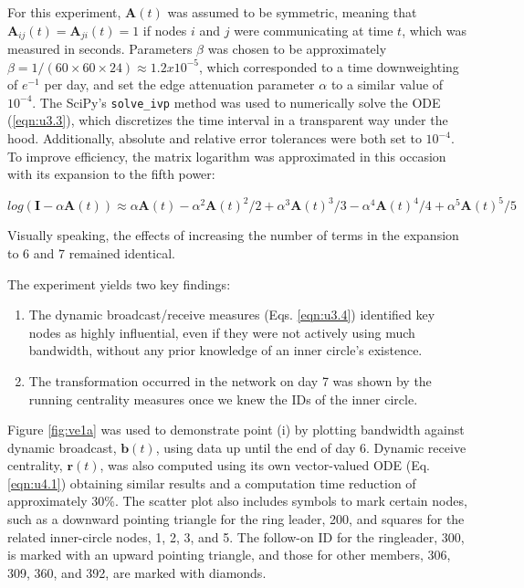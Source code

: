 For this experiment, $\mathbf{A}(t)$ was assumed to be symmetric, meaning that $\mathbf{A}_{ij}(t) = \mathbf{A}_{ji}(t) = 1$ if nodes $i$ and $j$ were communicating at time $t$, which was measured in seconds. Parameters $\beta$ was chosen to be approximately $\beta = 1/(60\times 60 \times 24) \approx 1.2 x 10^{-5}$, which corresponded to a time downweighting of $e^{-1}$ per day, and set the edge attenuation parameter $\alpha$ to a similar value of $10^{-4}$. The SciPy's \texttt{solve\_ivp} method was used to numerically solve the ODE (\ref{eqn:u3.3}), which discretizes the time interval in a transparent way under the hood. Additionally, absolute and relative error tolerances were both set to $10^{-4}$. To improve efficiency, the matrix logarithm was approximated in this occasion with its expansion to the fifth power:

$$log(\mathbf{I} - \alpha \mathbf{A}(t)) \approx \alpha \mathbf{A}(t) - \alpha^2 \mathbf{A}(t)^2/2 + \alpha^3 \mathbf{A}(t)^3/3 - \alpha^4 \mathbf{A}(t)^4/4 + \alpha^5 \mathbf{A}(t)^5/5$$ 

Visually speaking, the effects of increasing the number of terms in the expansion to 6 and 7 remained identical.

The experiment yields two key findings:
\begin{enumerate}[label=(\roman*)]
  \item The dynamic broadcast/receive measures (Eqs. \ref{eqn:u3.4}) identified key nodes as highly influential, even if they were not actively using much bandwidth, without any prior knowledge of an inner circle's existence.
  \item The transformation occurred in the network on day 7 was shown by the running centrality measures once we knew the IDs of the inner circle.
\end{enumerate}

Figure \ref{fig:ve1a} was used to demonstrate point (i) by plotting bandwidth against dynamic broadcast, $\mathbf{b}(t)$, using data up until the end of day 6. Dynamic receive centrality, $\mathbf{r}(t)$, was also computed using its own vector-valued ODE (Eq. \ref{eqn:u4.1}) obtaining similar results and a computation time reduction of approximately $30\%$. The scatter plot also includes symbols to mark certain nodes, such as a downward pointing triangle for the ring leader, 200, and squares for the related inner-circle nodes, 1, 2, 3, and 5. The follow-on ID for the ringleader, 300, is marked with an upward pointing triangle, and those for other members, 306, 309, 360, and 392, are marked with diamonds.

